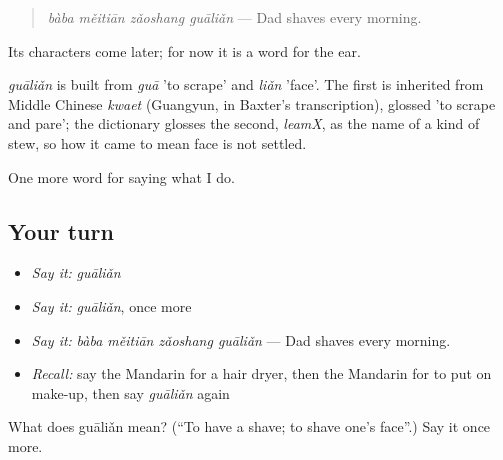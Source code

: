 \begin{quote}
\emph{bàba měitiān zǎoshang guāliǎn} — Dad shaves every morning.
\end{quote}

Its characters come later; for now it is a word for the ear.

\begin{cousinweb}
\emph{guāliǎn} is built from \emph{guā} 'to scrape' and \emph{liǎn} 'face'. The first is inherited from Middle Chinese \emph{kwaet} (Guangyun, in Baxter's transcription), glossed 'to scrape and pare'; the dictionary glosses the second, \emph{leamX}, as the name of a kind of stew, so how it came to mean face is not settled.
\end{cousinweb}

\begin{grammarlens}[title={What you've built}]
One more word for saying what I do.
\end{grammarlens}

\subsection*{Your turn}
\begin{itemize}
\raggedright
  \item \emph{Say it:} \emph{guāliǎn}
  \item \emph{Say it:} \emph{guāliǎn}, once more
  \item \emph{Say it:} \emph{bàba měitiān zǎoshang guāliǎn} — Dad shaves every morning.
  \item \emph{Recall:} say the Mandarin for a hair dryer, then the Mandarin for to put on make-up, then say \emph{guāliǎn} again
\end{itemize}

\begin{tcolorbox}[breakable,colback=teal!4,colframe=teal!35!black,title={Before you move on}]
What does guāliǎn mean? (\textquotedblleft{}To have a shave; to shave one's face\textquotedblright{}.) Say it once more.
\end{tcolorbox}

